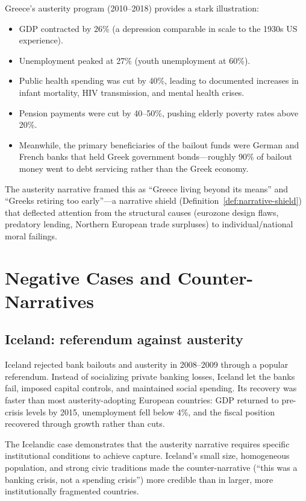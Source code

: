 \begin{example}
\label{ex:greece}
Greece's austerity program (2010--2018) provides a stark illustration:
\begin{itemize}[nosep]
  \item GDP contracted by 26\% (a depression comparable in scale to the 1930s US experience).
  \item Unemployment peaked at 27\% (youth unemployment at 60\%).
  \item Public health spending was cut by 40\%, leading to documented increases in infant mortality, HIV transmission, and mental health crises.
  \item Pension payments were cut by 40--50\%, pushing elderly poverty rates above 20\%.
  \item Meanwhile, the primary beneficiaries of the bailout funds were German and French banks that held Greek government bonds---roughly 90\% of bailout money went to debt servicing rather than the Greek economy.
\end{itemize}
The austerity narrative framed this as ``Greece living beyond its means'' and ``Greeks retiring too early''---a narrative shield (Definition~\ref{def:narrative-shield}) that deflected attention from the structural causes (eurozone design flaws, predatory lending, Northern European trade surpluses) to individual/national moral failings.
\end{example}

\section{Negative Cases and Counter-Narratives}
\label{sec:ch25-negative}

\subsection{Iceland: referendum against austerity}

Iceland rejected bank bailouts and austerity in 2008--2009 through a popular referendum.
Instead of socializing private banking losses, Iceland let the banks fail, imposed capital controls, and maintained social spending.
Its recovery was faster than most austerity-adopting European countries: GDP returned to pre-crisis levels by 2015, unemployment fell below 4\%, and the fiscal position recovered through growth rather than cuts.

The Icelandic case demonstrates that the austerity narrative requires specific institutional conditions to achieve capture.
Iceland's small size, homogeneous population, and strong civic traditions made the counter-narrative (``this was a banking crisis, not a spending crisis'') more credible than in larger, more institutionally fragmented countries.

